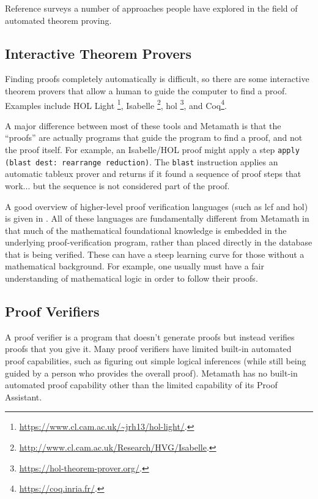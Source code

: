 Reference \cite{Bledsoe} surveys a number of approaches
people have explored in the field of automated theorem proving.

\subsection{Interactive Theorem Provers}\label{interactivetheoremprovers}

Finding proofs completely automatically is difficult, so there
are some interactive theorem provers that allow a human to guide the
computer to find a proof.
Examples include
HOL Light%
\footnote{\url{https://www.cl.cam.ac.uk/~jrh13/hol-light/}.},
Isabelle%
\footnote{\url{http://www.cl.cam.ac.uk/Research/HVG/Isabelle}.},
{\sc hol}%
\footnote{\url{https://hol-theorem-prover.org/}.},
and
Coq\footnote{\url{https://coq.inria.fr/}.}.

A major difference between most of these tools and Metamath is that the
``proofs'' are actually programs that guide the program to find a proof,
and not the proof itself.
For example, an Isabelle/HOL proof might apply a step
\texttt{apply (blast dest: rearrange reduction)}. The \texttt{blast}
instruction applies
an automatic tableux prover and returns if it found a sequence of proof
steps that work... but the sequence is not considered part of the proof.

A good overview of
higher-level proof verification languages (such as {\sc lcf} and {\sc hol})
is given in \cite{Harrison}.  All of these languages are fundamentally
different from Metamath in that much of the mathematical foundational
knowledge is embedded in the underlying proof-verification program, rather
than placed directly in the database that is being verified.
These can have a steep learning curve for those without a mathematical
background.  For example, one usually must have a fair understanding of
mathematical logic in order to follow their proofs.

\subsection{Proof Verifiers}\label{proofverifiers}

A proof verifier is a program that doesn't generate proofs but instead
verifies proofs that you give it.  Many proof verifiers have limited built-in
automated proof capabilities, such as figuring out simple logical inferences
(while still being guided by a person who provides the overall proof).  Metamath
has no built-in automated proof capability other than the limited
capability of its Proof Assistant.

